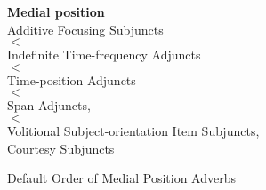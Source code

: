 \begin{singlespace}    
\begin{figure}[htbp]
    \small
    {\bf Medial position} \\
    \hspace*{2cm} Additive Focusing Subjuncts \\
    \hspace*{2cm} $<$ \\
    \hspace*{2cm} Indefinite Time-frequency Adjuncts \\
    \hspace*{2cm} $<$ \\
    \hspace*{2cm} Time-position Adjuncts \\
    \hspace*{2cm} $<$ \\
    \hspace*{2cm} Span Adjuncts, \\
    \hspace*{2cm} $<$ \\
    \hspace*{2cm} Volitional Subject-orientation Item Subjuncts, \\
    \hspace*{2cm} Courtesy Subjuncts 
  \caption{Default Order of Medial Position Adverbs}
  \label{fig:order-m}
\end{figure}
\end{singlespace}

